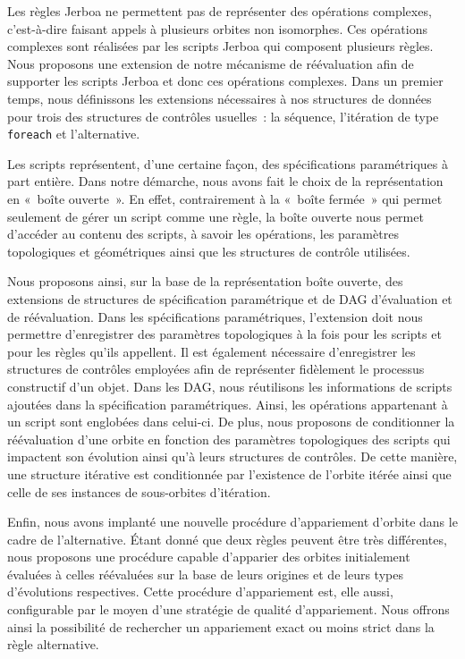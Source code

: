 Les règles Jerboa ne permettent pas de représenter des opérations complexes,
c'est-à-dire faisant appels à plusieurs orbites non isomorphes. %
Ces opérations complexes sont réalisées par les scripts Jerboa qui composent
plusieurs règles. %
Nous proposons une extension de notre mécanisme de réévaluation afin de
supporter les scripts Jerboa et donc ces opérations complexes. %
Dans un premier temps, nous définissons les extensions nécessaires à nos
structures de données pour trois des structures de contrôles usuelles~: la
séquence, l'itération de type \texttt{foreach} et l'alternative. %

Les scripts représentent, d'une certaine façon, des spécifications paramétriques
à part entière. %
Dans notre démarche, nous avons fait le choix de la représentation en «~boîte
ouverte~». %
En effet, contrairement à la «~boîte fermée~» qui permet seulement de gérer un
script comme une règle, la boîte ouverte nous permet d'accéder au contenu des
scripts, à savoir les opérations, les paramètres topologiques et géométriques
ainsi que les structures de contrôle utilisées. %

Nous proposons ainsi, sur la base de la représentation boîte ouverte, des
extensions de structures de spécification paramétrique et de DAG d'évaluation et
de réévaluation. %
Dans les spécifications paramétriques, l'extension doit nous permettre
d'enregistrer des paramètres topologiques à la fois pour les scripts et pour les
règles qu'ils appellent. %
Il est également nécessaire d'enregistrer les structures de contrôles employées
afin de représenter fidèlement le processus constructif d'un objet. %
Dans les DAG, nous réutilisons les informations de scripts ajoutées dans la
spécification paramétriques. %
Ainsi, les opérations appartenant à un script sont englobées dans celui-ci. %
De plus, nous proposons de conditionner la réévaluation d'une orbite en fonction
des paramètres topologiques des scripts qui impactent son évolution ainsi qu'à
leurs structures de contrôles. %
De cette manière, une structure itérative est conditionnée par l'existence de
l'orbite itérée ainsi que celle de ses instances de sous-orbites d'itération. %

Enfin, nous avons implanté une nouvelle procédure d'appariement d'orbite dans le
cadre de l'alternative. %
Étant donné que deux règles peuvent être très différentes, nous proposons une
procédure capable d'apparier des orbites initialement évaluées à celles
réévaluées sur la base de leurs origines et de leurs types d'évolutions
respectives. %
Cette procédure d'appariement est, elle aussi, configurable par le moyen d'une
stratégie de qualité d'appariement. %
Nous offrons ainsi la possibilité de rechercher un appariement exact ou moins
strict dans la règle alternative. %


